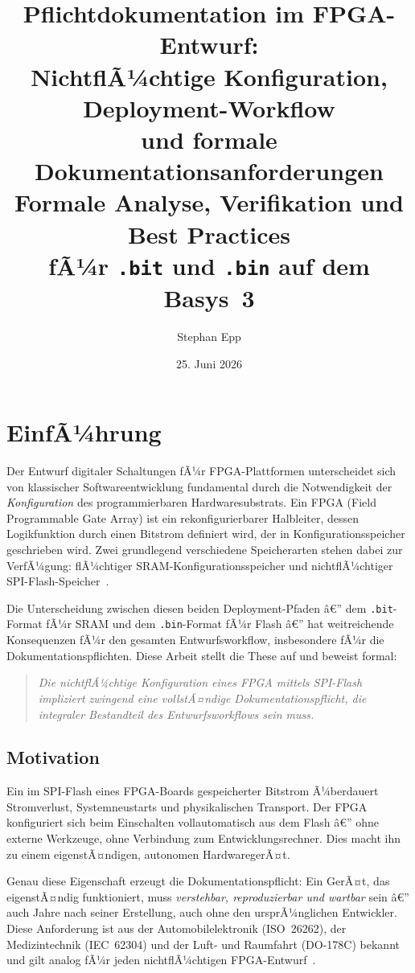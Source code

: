 ﻿\documentclass[a4paper,12pt]{article}
\title{Pflichtdokumentation im FPGA-Entwurf:\\
NichtflÃ¼chtige Konfiguration, Deployment-Workflow\\
und formale Dokumentationsanforderungen\\\large
Formale Analyse, Verifikation und Best Practices\\
fÃ¼r \texttt{.bit} und \texttt{.bin} auf dem Basys~3}
\author{Stephan Epp}
\date{25. Juni 2026}
\theoremstyle{definition}
\begin{document}
\maketitle
\tableofcontents
\newpage

\section{EinfÃ¼hrung}

Der Entwurf digitaler Schaltungen fÃ¼r FPGA-Plattformen unterscheidet sich von
klassischer Softwareentwicklung fundamental durch die Notwendigkeit der
\emph{Konfiguration} des programmierbaren Hardwaresubstrats. Ein FPGA
(Field Programmable Gate Array) ist ein rekonfigurierbarer Halbleiter,
dessen Logikfunktion durch einen Bitstrom definiert wird, der in
Konfigurationsspeicher geschrieben wird. Zwei grundlegend verschiedene
Speicherarten stehen dabei zur VerfÃ¼gung: flÃ¼chtiger SRAM-Konfigurationsspeicher
und nichtflÃ¼chtiger SPI-Flash-Speicher~\cite{xilinx2019,digilent2023}.

Die Unterscheidung zwischen diesen beiden Deployment-Pfaden â€” dem
\texttt{.bit}-Format fÃ¼r SRAM und dem \texttt{.bin}-Format fÃ¼r Flash â€”
hat weitreichende Konsequenzen fÃ¼r den gesamten Entwurfsworkflow,
insbesondere fÃ¼r die Dokumentationspflichten. Diese Arbeit stellt die
These auf und beweist formal:

\begin{quote}
\emph{Die nichtflÃ¼chtige Konfiguration eines FPGA mittels SPI-Flash impliziert
zwingend eine vollstÃ¤ndige Dokumentationspflicht, die integraler Bestandteil
des Entwurfsworkflows sein muss.}
\end{quote}

\subsection{Motivation}

Ein im SPI-Flash eines FPGA-Boards gespeicherter Bitstrom Ã¼berdauert
Stromverlust, Systemneustarts und physikalischen Transport. Der FPGA
konfiguriert sich beim Einschalten vollautomatisch aus dem Flash â€” ohne
externe Werkzeuge, ohne Verbindung zum Entwicklungsrechner. Dies macht
ihn zu einem eigenstÃ¤ndigen, autonomen HardwaregerÃ¤t.

Genau diese Eigenschaft erzeugt die Dokumentationspflicht: Ein GerÃ¤t,
das eigenstÃ¤ndig funktioniert, muss \emph{verstehbar, reproduzierbar
und wartbar} sein â€” auch Jahre nach seiner Erstellung, auch ohne den
ursprÃ¼nglichen Entwickler. Diese Anforderung ist aus der Automobilelektronik
(ISO~26262), der Medizintechnik (IEC~62304) und der Luft- und Raumfahrt
(DO-178C) bekannt und gilt analog fÃ¼r jeden nichtflÃ¼chtigen
FPGA-Entwurf~\cite{iso26262,iec62304}.
\end{document}
